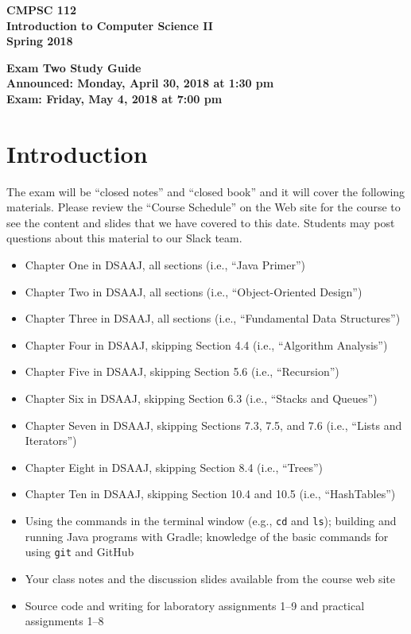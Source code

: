 \documentclass[11pt]{article}
\newcommand{\assignmentduedate}{May 4}
\newcommand{\assignmentassignedate}{April 30}
\newcommand{\assignmentnumber}{Two}
\newcommand{\labyear}{2018}
\newcommand{\assignedday}{Monday}
\newcommand{\dueday}{Friday}
\newcommand{\assignedtime}{1:30 pm}
\newcommand{\labtime}{7:00 pm}
\newcommand{\assigneddate}{Announced: \assignedday, \assignmentassignedate, \labyear{} at \assignedtime{}}
\newcommand{\duedate}{Exam: \dueday, \assignmentduedate, \labyear{} at \labtime{}}
\newcommand{\program}[1]{\lstinline{#1}}
\newcommand{\guidetitle}[1]
{
  \begin{center}
    \begin{center}
      \bf
      CMPSC 112\\Introduction to Computer Science II\\
      Spring 2018\\
      \medskip
    \end{center}
    \bf
    #1
  \end{center}
}
\begin{document}
\thispagestyle{empty}

\guidetitle{Exam \assignmentnumber{} Study Guide \\ \assigneddate{} \\ \duedate{}}

\section*{Introduction}

\noindent
The exam will be ``closed notes'' and ``closed book'' and it will cover the
following materials. Please review the ``Course Schedule'' on the Web site for
the course to see the content and slides that we have covered to this date.
Students may post questions about this material to our Slack team.

\begin{itemize}

  \itemsep 0in

  \item Chapter One in DSAAJ, all sections (i.e., ``Java Primer'')

  \item Chapter Two in DSAAJ, all sections (i.e., ``Object-Oriented Design'')

  \item Chapter Three in DSAAJ, all sections (i.e., ``Fundamental Data Structures'')

  \item Chapter Four in DSAAJ, skipping Section 4.4 (i.e., ``Algorithm Analysis'')

  \item Chapter Five in DSAAJ, skipping Section 5.6 (i.e., ``Recursion'')

  \item Chapter Six in DSAAJ, skipping Section 6.3 (i.e., ``Stacks and Queues'')

  \item Chapter Seven in DSAAJ, skipping Sections 7.3, 7.5, and 7.6 (i.e., ``Lists and Iterators'')

  \item Chapter Eight in DSAAJ, skipping Section 8.4 (i.e., ``Trees'')

  \item Chapter Ten in DSAAJ, skipping Section 10.4 and 10.5 (i.e., ``HashTables'')

  \item Using the commands in the terminal window (e.g., \program{cd} and
    \program{ls}); building and running Java programs with Gradle; knowledge of
    the basic commands for using \program{git} and GitHub

  \item Your class notes and the discussion slides available from the course web
    site

  \item Source code and writing for laboratory assignments 1--9 and practical
    assignments 1--8

\end{itemize}
\end{document}
